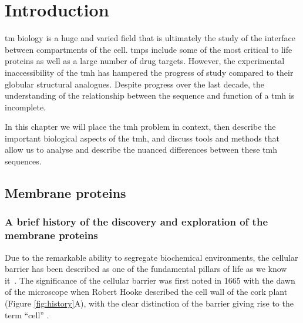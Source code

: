 \chapter{Introduction}
\sloppy
\gls{tm} biology is a huge and varied field that is ultimately the study of the interface between compartments of the cell.
\gls{tmp}s include some of the most critical to life proteins as well as a large number of drug targets.
However, the experimental inaccessibility of the \gls{tmh} has hampered the progress of study compared to their globular structural analogues.
Despite progress over the last decade, the understanding of the relationship between the sequence and function of a \gls{tmh} is incomplete.

In this chapter we will place the \gls{tmh} problem in context, then describe the important biological aspects of the \gls{tmh}, and discuss tools and methods that allow us to analyse and describe the nuanced differences between these \gls{tmh} sequences.

\section{Membrane proteins}

\subsection{A brief history of the discovery and exploration of the membrane proteins}

Due to the remarkable ability to segregate biochemical environments, the cellular barrier has been described as one of the fundamental pillars of life as we know it~\cite{Ladokhin2015}.
The significance of the cellular barrier was first noted in 1665 with the dawn of the microscope when Robert Hooke described the cell wall of the cork plant (Figure \ref{fig:history}A), with the clear distinction of the barrier giving rise to the term ``cell'' \cite{Donaldson2010, hooke1961micrographia}.


